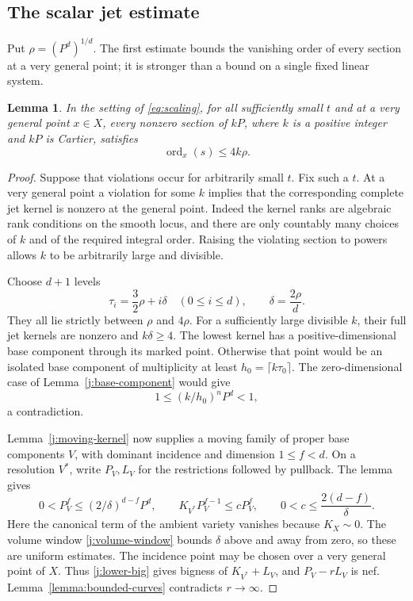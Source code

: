 \documentclass[12pt,a4paper,psamsfonts]{amsart}
\theoremstyle{definition}
\theoremstyle{plain}
\newtheorem{lemma}{Lemma}[section]
\DeclareMathOperator{\ord}{ord}
\begin{document}
\subsection{The scalar jet estimate}

Put $\rho=(P^d)^{1/d}$. The first estimate bounds the vanishing order
of every section at a very general point; it is stronger than a
bound on a single fixed linear system.

\begin{lemma}\label{lemma:scalar-bound}
In the setting of \eqref{eq:scaling}, for all sufficiently small $t$
and at a very general point $x\in X$, every nonzero section of $kP$,
where $k$ is a positive integer and $kP$ is Cartier, satisfies
\begin{equation}\label{j:scalar-order}
                         \ord_x(s)\le4k\rho.
\end{equation}
\end{lemma}

\begin{proof}
Suppose that violations occur for arbitrarily small $t$. Fix such a
$t$. At a very general point a violation for some $k$ implies that
the corresponding complete jet kernel is nonzero at the general
point. Indeed the kernel ranks are algebraic rank conditions on the
smooth locus, and there are only countably many choices of $k$ and
of the required integral order. Raising the violating section to
powers allows $k$ to be arbitrarily large and divisible.

Choose $d+1$ levels
\[
 \tau_i=\frac32\rho+i\delta\quad(0\le i\le d),
 \qquad \delta=\frac{2\rho}{d}.
\]
They all lie strictly between $\rho$ and $4\rho$. For a sufficiently
large divisible $k$, their full jet kernels are nonzero and
$k\delta\ge4$. The lowest kernel has a positive-dimensional base
component through its marked point. Otherwise that point would be
an isolated base component of multiplicity at least
$h_0=\lceil k\tau_0\rceil$. The zero-dimensional case of
Lemma~\ref{j:base-component} would give
\[
                1\le (k/h_0)^nP^d<1,
\]
a contradiction.

Lemma~\ref{j:moving-kernel} now supplies a moving family of proper
base components $V$, with dominant incidence and dimension
$1\le f<d$. On a resolution $V^*$, write $P_V,L_V$ for the
restrictions followed by pullback. The lemma gives
\[
 0<P_V^f\le(2/\delta)^{d-f}P^d,
 \qquad K_{V^*}P_V^{f-1}\le cP_V^f,
 \qquad 0<c\le\frac{2(d-f)}{\delta}.
\]
Here the canonical term of the ambient variety vanishes because
$K_X\sim0$. The volume window \eqref{j:volume-window} bounds
$\delta$ above and away from zero, so these are uniform estimates.
The incidence point may be chosen over a very general point of $X$.
Thus \eqref{j:lower-big} gives bigness of $K_{V^*}+L_V$, and
$P_V-rL_V$ is nef. Lemma~\ref{lemma:bounded-curves} contradicts
$r\to\infty$.
\end{proof}
\end{document}
